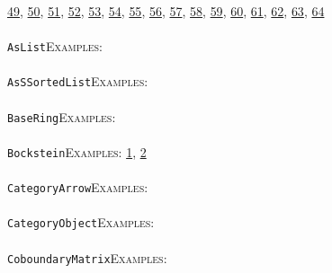 \documentclass[a4paper,11pt]{report}
\begin{document}
{{\href{../www/SideLinks/About/aboutSpaceGroup.html} {49}{\nobreakspace}, \href{../www/SideLinks/About/aboutFunctorial.html} {50}{\nobreakspace}, \href{../www/SideLinks/About/aboutSuperperfect.html} {51}{\nobreakspace}, \href{../www/SideLinks/About/aboutGouter.html} {52}{\nobreakspace}, \href{../www/SideLinks/About/aboutSurvey.html} {53}{\nobreakspace}, \href{../www/SideLinks/About/aboutGraphsOfGroups.html} {54}{\nobreakspace}, \href{../www/SideLinks/About/aboutTDA.html} {55}{\nobreakspace}, \href{../www/SideLinks/About/aboutIntro.html} {56}{\nobreakspace}, \href{../www/SideLinks/About/aboutKnots.html} {57}{\nobreakspace}, \href{../www/SideLinks/About/aboutTensorSquare.html} {58}{\nobreakspace}, \href{../www/SideLinks/About/aboutKnotsQuandles.html} {59}{\nobreakspace}, \href{../www/SideLinks/About/aboutTopology.html} {60}{\nobreakspace}, \href{../www/SideLinks/About/aboutLieCovers.html} {61}{\nobreakspace}, \href{../www/SideLinks/About/aboutTorAndExt.html} {62}{\nobreakspace}, \href{../www/SideLinks/About/aboutLie.html} {63}{\nobreakspace}, \href{../www/SideLinks/About/aboutTwistedCoefficients.html} {64}{\nobreakspace} \\
 \\
 \texttt{AsList}{\nobreakspace}{\nobreakspace}{\nobreakspace}{\nobreakspace}\textsc{Examples:} \\
 \\
 \texttt{AsSSortedList}{\nobreakspace}{\nobreakspace}{\nobreakspace}{\nobreakspace}\textsc{Examples:} \\
 \\
 \texttt{BaseRing}{\nobreakspace}{\nobreakspace}{\nobreakspace}{\nobreakspace}\textsc{Examples:} \\
 \\
 \texttt{Bockstein}{\nobreakspace}{\nobreakspace}{\nobreakspace}{\nobreakspace}\textsc{Examples:} \href{tutorial/chap7.html} {1}{\nobreakspace}, \href{../www/SideLinks/About/aboutModPRings.html} {2}{\nobreakspace} \\
 \\
 \texttt{CategoryArrow}{\nobreakspace}{\nobreakspace}{\nobreakspace}{\nobreakspace}\textsc{Examples:} \\
 \\
 \texttt{CategoryObject}{\nobreakspace}{\nobreakspace}{\nobreakspace}{\nobreakspace}\textsc{Examples:} \\
 \\
 \texttt{CoboundaryMatrix}{\nobreakspace}{\nobreakspace}{\nobreakspace}{\nobreakspace}\textsc{Examples:} \\
}}
\end{document}
